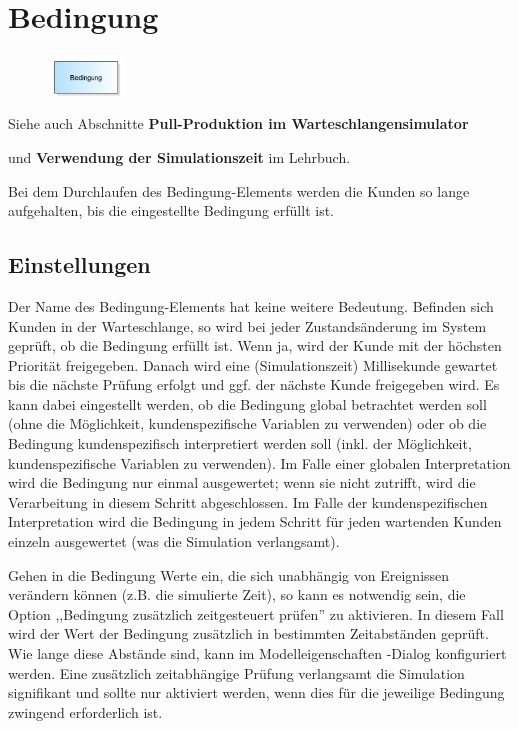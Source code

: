 \section{Bedingung}
\label{ref:ModelElementHold}

\begin{figure}
\vspace{-22pt}
\includegraphics[width=2cm]{imageModelElementHold.png}
\vspace{-22pt}
\end{figure}

Siehe auch Abschnitte \textbf{Pull-Produktion im Warteschlangensimulator}

und \textbf{Verwendung der Simulationszeit} im Lehrbuch.

Bei dem Durchlaufen des Bedingung-Elements werden die Kunden so lange aufgehalten, bis die eingestellte Bedingung erfüllt ist. 

\subsection*{Einstellungen}

Der Name des Bedingung-Elements hat keine weitere Bedeutung. Befinden sich Kunden in der Warteschlange, so wird bei jeder Zustandsänderung im System
geprüft, ob die Bedingung erfüllt ist. Wenn ja, wird der Kunde mit der höchsten Priorität freigegeben. Danach wird eine (Simulationszeit) Millisekunde
gewartet bis die nächste Prüfung erfolgt und ggf. der nächste Kunde freigegeben wird. Es kann dabei eingestellt werden, ob die Bedingung global
betrachtet werden soll (ohne die Möglichkeit, kundenspezifische Variablen zu verwenden) oder ob die Bedingung kundenspezifisch interpretiert
werden soll (inkl. der Möglichkeit, kundenspezifische Variablen zu verwenden). Im Falle einer globalen Interpretation wird die Bedingung nur
einmal ausgewertet; wenn sie nicht zutrifft, wird die Verarbeitung in diesem Schritt abgeschlossen. Im Falle der kundenspezifischen Interpretation
wird die Bedingung in jedem Schritt für jeden wartenden Kunden einzeln ausgewertet (was die Simulation verlangsamt).

Gehen in die Bedingung Werte ein, die sich unabhängig von Ereignissen verändern können (z.B. die simulierte Zeit), so kann es notwendig sein,
die Option ,,Bedingung zusätzlich zeitgesteuert prüfen'' zu aktivieren. In diesem Fall wird der Wert der Bedingung zusätzlich in bestimmten
Zeitabständen geprüft. Wie lange diese Abstände sind, kann im Modelleigenschaften -Dialog konfiguriert
werden. Eine zusätzlich zeitabhängige Prüfung verlangsamt die Simulation signifikant und sollte nur aktiviert werden, wenn dies für die
jeweilige Bedingung zwingend erforderlich ist. 

